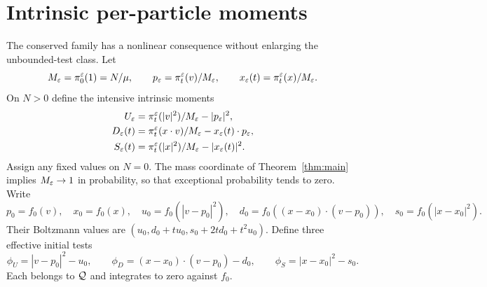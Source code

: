 \section{Intrinsic per-particle moments}\label{sec:intrinsic}
The conserved family has a nonlinear consequence without enlarging the
unbounded-test class. Let
\[
 M_\varepsilon=\pi_0^\varepsilon(1)=N/\mu,\qquad
 p_\varepsilon=\pi_t^\varepsilon(v)/M_\varepsilon,\qquad
 x_\varepsilon(t)=\pi_t^\varepsilon(x)/M_\varepsilon.
\]
On $N>0$ define the intensive intrinsic moments
\begin{equation}\label{eq:intrinsic-def}
 \begin{split}
 U_\varepsilon&=\pi_t^\varepsilon(|v|^2)/M_\varepsilon-|p_\varepsilon|^2,\\
 D_\varepsilon(t)&=\pi_t^\varepsilon(x\cdot v)/M_\varepsilon-x_\varepsilon(t)\cdot p_\varepsilon,\\
 S_\varepsilon(t)&=\pi_t^\varepsilon(|x|^2)/M_\varepsilon-|x_\varepsilon(t)|^2.
 \end{split}
\end{equation}
Assign any fixed values on $N=0$. The mass coordinate of
Theorem~\ref{thm:main} implies $M_\varepsilon\to1$ in probability, so that
exceptional probability tends to zero. Write
\[
 p_0=f_0(v),\quad x_0=f_0(x),\quad
 u_0=f_0(|v-p_0|^2),\quad
 d_0=f_0((x-x_0)\cdot(v-p_0)),\quad
 s_0=f_0(|x-x_0|^2).
\]
Their Boltzmann values are $(u_0,d_0+tu_0,s_0+2td_0+t^2u_0)$.
Define three effective initial tests
\begin{equation}\label{eq:effective-tests}
 \phi_U=|v-p_0|^2-u_0,\qquad
 \phi_D=(x-x_0)\cdot(v-p_0)-d_0,\qquad
 \phi_S=|x-x_0|^2-s_0.
\end{equation}
Each belongs to $\mathcal Q$ and integrates to zero against $f_0$.

